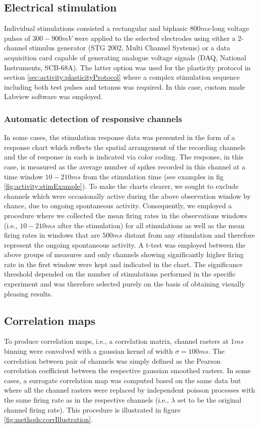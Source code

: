 \subsection{Electrical stimulation}
Individual stimulations consisted a rectangular and biphasic \(800 ms\)-long voltage pulses of \(300-900 mV\) were applied to the selected electrodes using either a 2-channel stimulus generator (STG 2002, Multi Channel Systems) or a data acquisition card capable of generating analogue voltage signals (DAQ, National Instruments, SCB-68A). The latter option was used for the plasticity protocol in section \ref{sec:activity:plasticityProtocol} where a complex stimulation sequence including both test pulses and tetanus was required. In this case, custom made Labview software was employed.

\label{sec:methods:stim}


\subsubsection{Automatic detection of responsive channels}
In some cases, the stimulation response data was presented in the form of a response chart which reflects the spatial arrangement of the recording channels and the of response in each is indicated via color coding. The response, in this case, is measured as the average number of spikes recorded in this channel at a time window \(10-210ms\) from the stimulation time (see examples in fig \ref{fig:activity:stimExample}). To make the charts clearer, we sought to exclude channels which were occasionally active during the above observation window by chance, due to ongoing spontaneous activity. Consequently, we employed a procedure where we collected the mean firing rates in the observations windows (i.e., \(10-210ms\) after the stimulation) for all stimulations as well as the mean firing rates in windows that are \(500ms\) distant from any stimulation and therefore represent the ongoing spontaneous activity. A t-test was employed between the above groups of measures and only channels showing significantly higher firing rate in the first window were kept and indicated in the chart. The significance threshold depended on the number of stimulations performed in the specific experiment and was therefore selected purely on the basis of obtaining visually pleasing results.


\subsection{Correlation maps}
To produce correlation maps, i.e., a correlation matrix, channel rasters at \(1ms\) binning were convolved with a gaussian kernel of width \(\sigma=100ms\). The correlation between pair of channels was simply defined as the Pearson correlation coefficient between the respective gaussian smoothed rasters. In some cases, a surrogate correlation map was computed based on the same data but where all the channel rasters were replaced by independent poisson processes with the same firing rate as in the respective channels (i.e., \(\lambda\) set to be the original channel firing rate). This procedure is illustrated in figure \ref{fig:methods:corrIllustration}.

